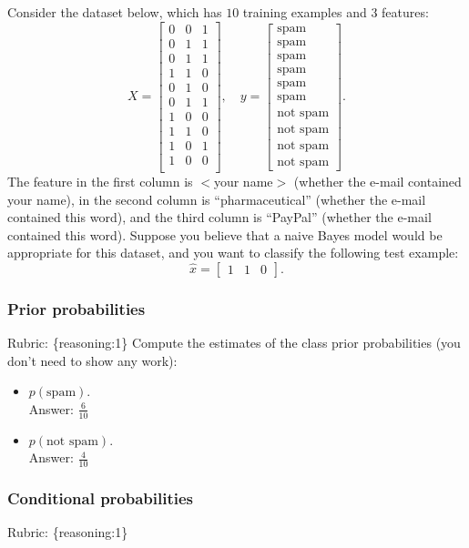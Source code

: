 \documentclass{article}
\def\rubric#1{\gre{Rubric: \{#1\}}}{}
\def\blu#1{{\color{blu}#1}}
\def\gre#1{{\color{gre}#1}}
\def\items#1{\begin{itemize}#1\end{itemize}}
\begin{document}
Consider the dataset below, which has $10$ training examples and $3$ features:
\[
X = \begin{bmatrix}0 & 0 & 1\\0 & 1 & 1\\ 0 & 1 & 1\\ 1 & 1 & 0\\0 & 1 & 0\\0 & 1 & 1\\1 & 0 & 0\\1 & 1 & 0\\1 & 0 & 1\\1 & 0 & 0\\\end{bmatrix}, \quad y = \begin{bmatrix}\text{spam}\\\text{spam}\\\text{spam}\\\text{spam}\\\text{spam}\\\text{spam}\\\text{not spam}\\\text{not spam}\\\text{not spam}\\\text{not spam}\end{bmatrix}.
\]
The feature in the first column is $<$your name$>$ (whether the e-mail contained your name), in the second column is ``pharmaceutical'' (whether the e-mail contained this word), and the third column is ``PayPal'' (whether the e-mail contained this word).
Suppose you believe that a naive Bayes model would be appropriate for this dataset, and you want to classify the following test example:
\[
\hat{x} = \begin{bmatrix}1 & 1 & 0\end{bmatrix}.
\]

\subsubsection{Prior probabilities}
\rubric{reasoning:1}
\blu{Compute the estimates of the class prior probabilities} (you don't need to show any work):
\items{
\item$ p(\text{spam})$.\\
 \gre{ Answer: $\frac{6}{10}$ }
\item $p(\text{not spam})$. \\
 \gre{Answer: $\frac{4}{10}$}
}

\subsubsection{Conditional probabilities}
\rubric{reasoning:1}
\end{document}
